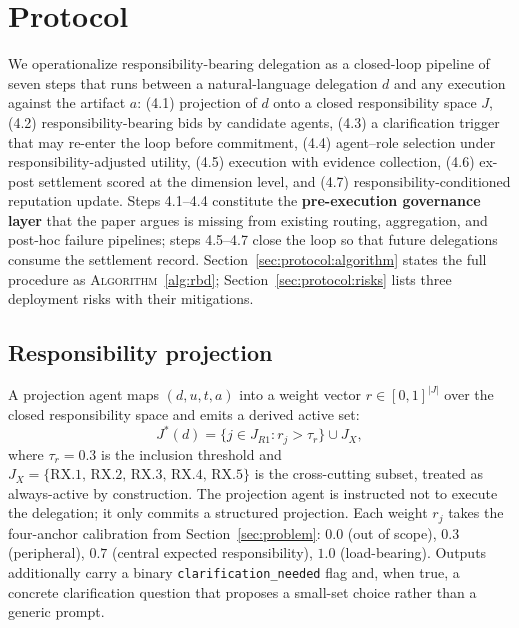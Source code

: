 \section{Protocol}
\label{sec:protocol}

We operationalize responsibility-bearing delegation as a closed-loop pipeline of seven steps that runs between a natural-language delegation $d$ and any execution against the artifact $a$: (4.1) projection of $d$ onto a closed responsibility space $J$, (4.2) responsibility-bearing bids by candidate agents, (4.3) a clarification trigger that may re-enter the loop before commitment, (4.4) agent--role selection under responsibility-adjusted utility, (4.5) execution with evidence collection, (4.6) ex-post settlement scored at the dimension level, and (4.7) responsibility-conditioned reputation update. Steps 4.1--4.4 constitute the \textbf{pre-execution governance layer} that the paper argues is missing from existing routing, aggregation, and post-hoc failure pipelines; steps 4.5--4.7 close the loop so that future delegations consume the settlement record. Section~\ref{sec:protocol:algorithm} states the full procedure as \textsc{Algorithm}~\ref{alg:rbd}; Section~\ref{sec:protocol:risks} lists three deployment risks with their mitigations.

\subsection{Responsibility projection}
\label{sec:protocol:projection}

A projection agent maps $(d, u, t, a)$ into a weight vector $r \in [0, 1]^{|J|}$ over the closed responsibility space and emits a derived active set:
\begin{equation}
J^*(d) = \{ j \in J_{R1} : r_j > \tau_r \} \cup J_X,
\label{eq:active_set}
\end{equation}
where $\tau_r = 0.3$ is the inclusion threshold and $J_X = \{\text{RX.1, RX.2, RX.3, RX.4, RX.5}\}$ is the cross-cutting subset, treated as always-active by construction. The projection agent is instructed not to execute the delegation; it only commits a structured projection. Each weight $r_j$ takes the four-anchor calibration from Section~\ref{sec:problem}: $0.0$ (out of scope), $0.3$ (peripheral), $0.7$ (central expected responsibility), $1.0$ (load-bearing). Outputs additionally carry a binary \texttt{clarification\_needed} flag and, when true, a concrete clarification question that proposes a small-set choice rather than a generic prompt.

